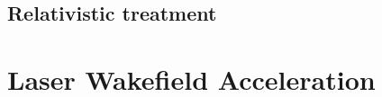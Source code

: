 \documentclass[12pt, class=report, crop=false]{standalone}
\begin{document}
\subsection{Relativistic treatment}

\section{Laser Wakefield Acceleration}
\end{document}
